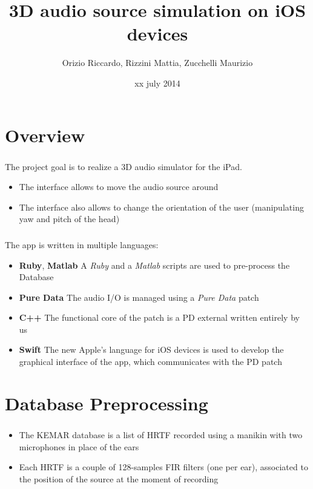 \documentclass{beamer}
\title{3D audio source simulation on iOS devices}
\author[Orizio, Rizzini, Zucchelli]{Orizio Riccardo, Rizzini Mattia, Zucchelli Maurizio}
\date{xx july 2014}
\institute[UniBS]{University of Brescia}
\begin{document}
	\begin{frame}
		\maketitle
	\end{frame}

	\section{Overview}
	
	\begin{frame}
		\frametitle{\insertsection}
		The project goal is to realize a 3D audio simulator for the iPad.
		\begin{itemize}
			\item The interface allows to move the audio source around
			\item The interface also allows to change the orientation of the user (manipulating yaw
				and pitch of the head)
		\end{itemize}
	\end{frame}

	\begin{frame}
		\frametitle{\insertsection}
		The app is written in multiple languages:
		\begin{itemize}
			\item {\bf Ruby}, {\bf Matlab} A {\em Ruby} and a {\em Matlab} scripts are used to 
				pre-process the Database
			\item {\bf Pure Data} The audio I/O is managed using a {\em Pure Data} patch
			\item {\bf C++} The functional core of the patch is a PD external written entirely
				by us
			\item {\bf Swift} The new Apple's language for iOS devices is used to develop the
				graphical interface of the app, which communicates with the PD patch
		\end{itemize}
	\end{frame}

	\AtBeginSection[]
	{
		\begin{frame}
			\frametitle{Outline}
			\tableofcontents[currentsection]
		\end{frame}
	}

	\section{Database Preprocessing}

	\begin{frame}
		\frametitle{\insertsection}
		\begin{itemize}
			\item The \textsc{KEMAR} database is a list of \textsc{HRTF} recorded using a manikin with two
				microphones in place of the ears
			\item Each \textsc{HRTF} is a couple of 128-samples FIR filters (one per ear), associated to the position
				of the source at the moment of recording
		\end{itemize}
	\end{frame}
\end{document}
